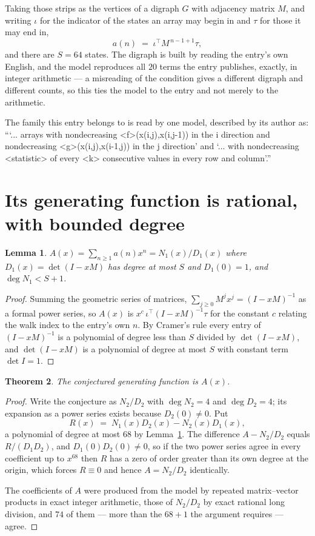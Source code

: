 \documentclass[11pt,a4paper]{article}
\theoremstyle{plain}
\newtheorem{theorem}{Theorem}
\newtheorem{lemma}[theorem]{Lemma}
\theoremstyle{definition}
\begin{document}
Taking those strips as the vertices of a digraph $G$ with adjacency matrix $M$, and writing
$\iota$ for the indicator of the states an array may begin in and $\tau$ for those it may end
in,
\[
a(n)\;=\;\iota^{\!\top}M^{\,n-1+1}\tau ,
\]
and there are $S=64$ states. The digraph is built by reading the entry's own English, and the
model reproduces all $20$ terms the entry publishes, exactly, in integer arithmetic --- a
misreading of the condition gives a different digraph and different counts, so this ties the
model to the entry and not merely to the arithmetic.

The family this entry belongs to is read by one model, described by its author as: ```... arrays with nondecreasing <f>(x(i,j),x(i,j-1)) in the i direction and nondecreasing <g>(x(i,j),x(i-1,j)) in the j direction' and `... with nondecreasing <statistic> of every <k> consecutive values in every row and column'.''


\section{Its generating function is rational, with bounded degree}

\begin{lemma}\label{lem:rat}
$A(x)=\sum_{n\ge1}a(n)x^n=N_1(x)/D_1(x)$ where $D_1(x)=\det(I-xM)$ has degree at most
$S$ and $D_1(0)=1$, and $\deg N_1<S+1$.
\end{lemma}

\begin{proof}
Summing the geometric series of matrices, $\sum_{j\ge0}M^jx^j=(I-xM)^{-1}$ as a formal
power series, so $A(x)$ is $x^{c}\,\iota^{\!\top}(I-xM)^{-1}\tau$ for the constant $c$
relating the walk index to the entry's own $n$. By Cramer's rule every entry of
$(I-xM)^{-1}$ is a polynomial of degree less than $S$ divided by $\det(I-xM)$, and
$\det(I-xM)$ is a polynomial of degree at most $S$ with constant term $\det I=1$.
\end{proof}

\begin{theorem}
The conjectured generating function is $A(x)$.
\end{theorem}

\begin{proof}
Write the conjecture as $N_2/D_2$ with $\deg N_2=4$ and $\deg D_2=4$; its expansion as a
power series exists because $D_2(0)\neq0$. Put
\[
R(x)\;=\;N_1(x)D_2(x)-N_2(x)D_1(x),
\]
a polynomial of degree at most $68$ by Lemma~\ref{lem:rat}. The difference
$A-N_2/D_2$ equals $R/(D_1D_2)$, and $D_1(0)D_2(0)\neq0$, so if the two power series agree in
every coefficient up to $x^{68}$ then $R$ has a zero of order greater than its own
degree at the origin, which forces $R\equiv0$ and hence $A=N_2/D_2$ identically.

The coefficients of $A$ were produced from the model by repeated matrix--vector products in
exact integer arithmetic, those of $N_2/D_2$ by exact rational long division, and $74$
of them --- more than the $68+1$ the argument requires --- agree.
\end{proof}
\end{document}
